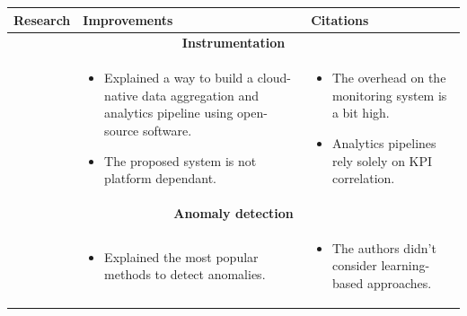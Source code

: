 \begin{longtable}{| p{25mm} | p{62mm} | p{62mm} |}
\hline
    \textbf{Research} &
    \textbf{Improvements} &
    \textbf{Citations} \\ \hline
    
    \multicolumn{3}{|c|}{\textbf{Instrumentation}} \\ \hline
    
    \cite{toka2021predicting} &
    \vspace{-8mm}
    \begin{itemize}[leftmargin=3mm,noitemsep,nolistsep] 
        \item Explained a way to build a cloud-native data aggregation and analytics pipeline using open-source software.
        \item The proposed system is not platform dependant.
        \vspace{-7mm}
    \end{itemize} &
    \vspace{-8mm}
    \begin{itemize}[leftmargin=3mm,noitemsep,nolistsep] 
        \item The overhead on the monitoring system is a bit high.
        \item Analytics pipelines rely solely on KPI correlation.
        \vspace{-7mm}
    \end{itemize} \\ \hline



    \multicolumn{3}{|c|}{\textbf{Anomaly detection}} \\ \hline
    
    \cite{prabodha2017monitoring} &
    \vspace{-8mm}
    \begin{itemize}[leftmargin=3mm,noitemsep,nolistsep] 
        \item Explained the most popular methods to detect anomalies.
        \vspace{-7mm}
    \end{itemize} &
    \vspace{-8mm}
    \begin{itemize}[leftmargin=3mm,noitemsep,nolistsep] 
        \item The authors didn't consider learning-based approaches.
        \vspace{-7mm}
    \end{itemize} \\ \hline
    

\end{longtable}
